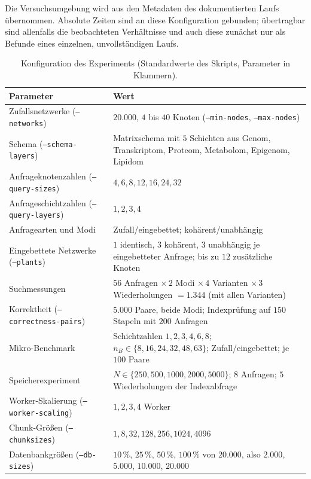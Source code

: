 \documentclass[a4paper,12pt, twoside]{report}
\theoremstyle{definition}
\begin{document}
Die Versuchsumgebung wird aus den Metadaten des dokumentierten Laufs übernommen. Absolute Zeiten sind an diese Konfiguration gebunden; übertragbar sind allenfalls die beobachteten Verhältnisse und auch diese zunächst nur als Befunde eines einzelnen, unvollständigen Laufs.

\begin{table}[!ht]
	\centering
	\small
	\caption{Konfiguration des Experiments (Standardwerte des Skripts, Parameter in Klammern).}
	\label{tab:ucx_setup}
	\begin{tabular}{@{}>{\raggedright\arraybackslash}p{5.2cm}>{\raggedright\arraybackslash}p{8.8cm}@{}}
		\toprule
		Parameter & Wert \\
		\midrule
		Zufallsnetzwerke (\texttt{--networks}) & $20.000$, $4$ bis $40$ Knoten (\texttt{--min-nodes}, \texttt{--max-nodes}) \\
		Schema (\texttt{--schema-layers}) & Matrixschema mit $5$ Schichten aus Genom, Transkriptom, Proteom, Metabolom, Epigenom, Lipidom \\
		Anfrageknotenzahlen (\texttt{--query-sizes}) & $4,6,8,12,16,24,32$ \\
		Anfrageschichtzahlen (\texttt{--query-layers}) & $1,2,3,4$ \\
		Anfragearten und Modi & Zufall/eingebettet; kohärent/unabhängig \\
		Eingebettete Netzwerke (\texttt{--plants}) & $1$ identisch, $3$ kohärent, $3$ unabhängig je eingebetteter Anfrage; bis zu $12$ zusätzliche Knoten \\
		Suchmessungen & $56$ Anfragen $\times\,2$ Modi $\times\,4$ Varianten $\times\,3$ Wiederholungen $=1.344$ (mit allen Varianten) \\
		Korrektheit (\texttt{--correctness-pairs}) & $5.000$ Paare, beide Modi; Indexprüfung auf $150$ Stapeln mit $200$ Anfragen \\
		Mikro-Benchmark & Schichtzahlen $1,2,3,4,6,8$; $n_B\in\{8,16,24,32,48,63\}$; Zufall/eingebettet; je $100$ Paare \\
		Speicherexperiment & $N\in\{250,500,1000,2000,5000\}$; $8$ Anfragen; $5$ Wiederholungen der Indexabfrage \\
		Worker-Skalierung (\texttt{--worker-scaling}) & $1,2,3,4$ Worker \\
		Chunk-Größen (\texttt{--chunksizes}) & $1,8,32,128,256,1024,4096$ \\
		Datenbankgrößen (\texttt{--db-sizes}) & $10\,\%$, $25\,\%$, $50\,\%$, $100\,\%$ von $20.000$, also $2.000$, $5.000$, $10.000$, $20.000$ \\

\end{tabular}
\end{table}
\end{document}
